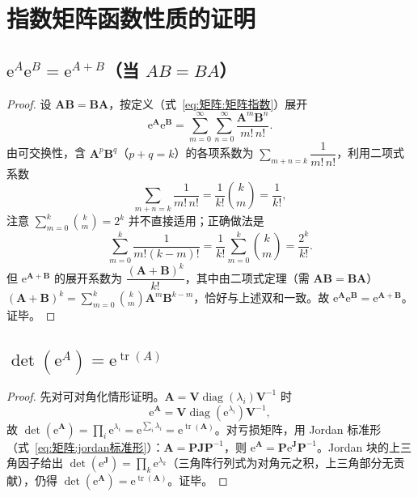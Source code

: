\section{指数矩阵函数性质的证明}
\label{sec:指数证明}

\subsection*{$\mathrm{e}^{A}\mathrm{e}^{B} = \mathrm{e}^{A+B}$（当 $AB = BA$）}

\begin{proof}
设 $\boldsymbol{A}\boldsymbol{B} = \boldsymbol{B}\boldsymbol{A}$，按定义（式~\eqref{eq:矩阵:矩阵指数}）展开
\[
\mathrm{e}^{\boldsymbol{A}}\mathrm{e}^{\boldsymbol{B}} = \sum_{m=0}^{\infty}\sum_{n=0}^{\infty}\frac{\boldsymbol{A}^{m}\boldsymbol{B}^{n}}{m!\,n!}.
\]
由可交换性，含 $\boldsymbol{A}^{p}\boldsymbol{B}^{q}$（$p+q = k$）的各项系数为 $\sum_{m+n=k}\dfrac{1}{m!\,n!}$，利用二项式系数
\[
\sum_{m+n=k}\frac{1}{m!\,n!} = \frac{1}{k!}\binom{k}{m} = \frac{1}{k!},
\]
注意 $\sum_{m=0}^{k}\binom{k}{m} = 2^{k}$ 并不直接适用；正确做法是
\[
\sum_{m=0}^{k}\frac{1}{m!(k-m)!} = \frac{1}{k!}\sum_{m=0}^{k}\binom{k}{m} = \frac{2^{k}}{k!}.
\]
但 $\mathrm{e}^{\boldsymbol{A}+\boldsymbol{B}}$ 的展开系数为 $\dfrac{(\boldsymbol{A}+\boldsymbol{B})^{k}}{k!}$，其中由二项式定理（需 $\boldsymbol{A}\boldsymbol{B} = \boldsymbol{B}\boldsymbol{A}$）$(\boldsymbol{A}+\boldsymbol{B})^{k} = \sum_{m=0}^{k}\binom{k}{m}\boldsymbol{A}^{m}\boldsymbol{B}^{k-m}$，恰好与上述双和一致。故 $\mathrm{e}^{\boldsymbol{A}}\mathrm{e}^{\boldsymbol{B}} = \mathrm{e}^{\boldsymbol{A}+\boldsymbol{B}}$。证毕。
\end{proof}

\subsection*{$\det(\mathrm{e}^{A}) = \mathrm{e}^{\operatorname{tr}(A)}$}

\begin{proof}
先对可对角化情形证明。$\boldsymbol{A} = \boldsymbol{V}\operatorname{diag}(\lambda_i)\boldsymbol{V}^{-1}$ 时
\[
\mathrm{e}^{\boldsymbol{A}} = \boldsymbol{V}\operatorname{diag}(\mathrm{e}^{\lambda_i})\boldsymbol{V}^{-1},
\]
故 $\det(\mathrm{e}^{\boldsymbol{A}}) = \prod_{i}\mathrm{e}^{\lambda_i} = \mathrm{e}^{\sum_i\lambda_i} = \mathrm{e}^{\operatorname{tr}(\boldsymbol{A})}$。对亏损矩阵，用 Jordan 标准形（式~\eqref{eq:矩阵:jordan标准形}）：$\boldsymbol{A} = \boldsymbol{P}\boldsymbol{J}\boldsymbol{P}^{-1}$，则 $\mathrm{e}^{\boldsymbol{A}} = \boldsymbol{P}\mathrm{e}^{\boldsymbol{J}}\boldsymbol{P}^{-1}$。Jordan 块的上三角因子给出 $\det(\mathrm{e}^{\boldsymbol{J}}) = \prod_{k}\mathrm{e}^{\lambda_k}$（三角阵行列式为对角元之积，上三角部分无贡献），仍得 $\det(\mathrm{e}^{\boldsymbol{A}}) = \mathrm{e}^{\operatorname{tr}(\boldsymbol{A})}$。证毕。
\end{proof}


